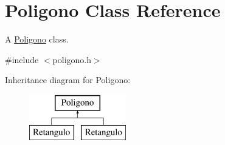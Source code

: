 \hypertarget{classPoligono}{}\section{Poligono Class Reference}
\label{classPoligono}


A \mbox{\hyperlink{classPoligono}{Poligono}} class.  




{\ttfamily \#include $<$poligono.\+h$>$}

Inheritance diagram for Poligono\+:\begin{figure}[H]
\begin{center}
\leavevmode
\includegraphics[height=2.000000cm]{classPoligono}
\end{center}
\end{figure}
